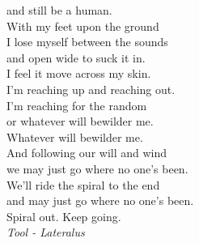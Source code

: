 \documentclass[12pt,twoside]{report}
\begin{document}
\begin{flushright}
{and still be a human. \\
\vspace{0.2 cm}
With my feet upon the ground \\
I lose myself between the sounds \\
and open wide to suck it in. \\
I feel it move across my skin. \\
I'm reaching up and reaching out. \\
I'm reaching for the random \\
or whatever will bewilder me. \\
Whatever will bewilder me. \\
And following our will and wind \\
we may just go where no one's been. \\
We'll ride the spiral to the end \\
and may just go where no one's been. \\
\vspace{0.2 cm}
Spiral out. Keep going. \\
\vspace{0.2 cm}
\emph{Tool - Lateralus}
}
\end{flushright}

\newpage




%   

\newpage


\end{document}
